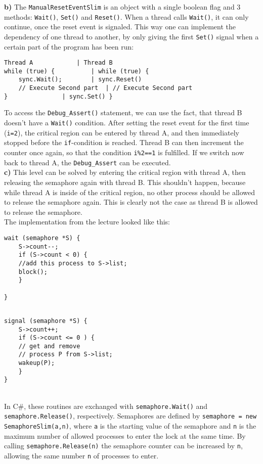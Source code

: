 \documentclass{article}
\begin{document}
\textbf{b)} The \texttt{ManualResetEventSlim} is an object with a single boolean
flag and 3 methods: \texttt{Wait()}, \texttt{Set()} and \texttt{Reset()}.
When a thread calls \texttt{Wait()}, it can only continue, once the reset event
is signaled. This way one can implement the dependency of one thread to another,
by only giving the first \texttt{Set()} signal when a certain part of the program
has been run:
\begin{lstlisting}
Thread A			| Thread B
while (true) {			| while (true) {
    sync.Wait();		| sync.Reset()
    // Execute Second part	| // Execute Second part
}				| sync.Set() }
\end{lstlisting}
To access the \texttt{Debug\_Assert()} statement, we can use the fact, that thread
B doesn't have a \texttt{Wait()} condition. After setting the reset event for the
first time (\texttt{i=2}), the critical region can be entered by thread A,
and then immediately stopped before the \texttt{if}-condition is reached. Thread
B can then increment the counter once again, so that the condition \texttt{i\%2==1}
is fulfilled. If we switch now back to thread A, the \texttt{Debug\_Assert} can be
executed. \\

\textbf{c)} This level can be solved by entering the critical region with thread A,
then releasing the semaphore again with thread B. This shouldn't happen, because
while thread A is inside of the critical region, no other process should be allowed
to release the semaphore again. This is clearly not the case as thread B is allowed
to release the semaphore. \\ The implementation from the lecture looked like this: \\
\begin{minipage}{.49\textwidth}
\begin{lstlisting}
wait (semaphore *S) {
    S->count--;
    if (S->count < 0) {
	//add this process to S->list;
	block(); 
    }

}
  
\end{lstlisting}
\end{minipage}
\begin{minipage}{.49\textwidth}
\begin{lstlisting}
signal (semaphore *S) {
    S->count++;
    if (S->count <= 0 ) {
	// get and remove
	// process P from S->list;
	wakeup(P);
    }
}
\end{lstlisting}
\end{minipage} \\
In C\#, these routines are exchanged with \texttt{semaphore.Wait()} and
\texttt{semaphore.Release()}, respectively.
Semaphores are defined by \texttt{semaphore = new SemaphoreSlim(a,n)}, where
\texttt{a} is the starting value of the semaphore and \texttt{n} is the maximum number of
allowed processes to enter the lock at the same time.
By calling \texttt{semaphore.Release(n)} the semaphore counter can be increased by
\texttt{n}, allowing the same number \texttt{n} of processes to enter. \\
\end{document}
